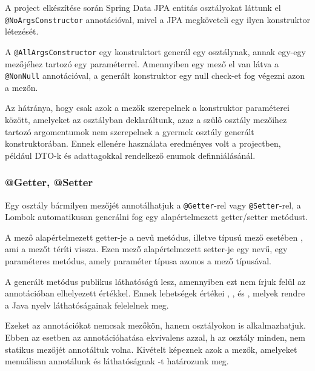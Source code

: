 
A project elkészítése során Spring Data JPA entitás osztályokat láttunk el \lstinline|@NoArgsConstructor| annotációval, mivel a JPA megköveteli egy ilyen konstruktor létezését. \par


A \lstinline|@AllArgsConstructor| egy konstruktort generál egy osztálynak, annak egy-egy mezőjéhez tartozó egy paraméterrel. Amennyiben egy mező el van látva a \lstinline|@NonNull| annotációval, a generált konstruktor egy null check-et fog végezni azon a mezőn.


Az  hátránya, hogy csak azok a mezők szerepelnek a konstruktor paraméterei között, amelyeket az osztályban deklaráltunk, azaz a szülő osztály mezőihez tartozó argomentumok nem szerepelnek a gyermek osztály generált konstruktorában. Ennek ellenére használata eredményes volt a projectben, például DTO-k és adattagokkal rendelkező enumok definniálásánál.


\subsubsection{@Getter, @Setter}

Egy osztály bármilyen mezőjét annotálhatjuk a  \lstinline|@Getter|-rel vagy \lstinline|@Setter|-rel, a Lombok automatikusan generálni fog egy alapértelmezett getter/setter metódust. \par

A  mező alapértelmezett getter-je a  nevű metódus, illetve  típusú mező esetében , ami a  mezőt téríti vissza. Ezen mező alapértelmezett setter-je egy  nevű, egy paraméteres metódus, amely paraméter típusa azonos a mező típusával. \par

A generált metódus publikus láthatóságú lesz, amennyiben ezt nem írjuk felül az annotációban elhelyezett  értékkel. Ennek lehetségek értékei , ,  és , melyek rendre a Java nyelv láthatóságainak felelelnek meg. \par

Ezeket az annotációkat nemcsak mezőkön, hanem osztályokon is alkalmazhatjuk. Ebben az esetben az annotációhatása ekvivalens azzal, h az osztály minden, nem statikus mezőjét annotáltuk volna. Kivételt képeznek azok a mezők, amelyeket menuálisan annotálunk és láthatóságnak -t határozunk meg. \par

